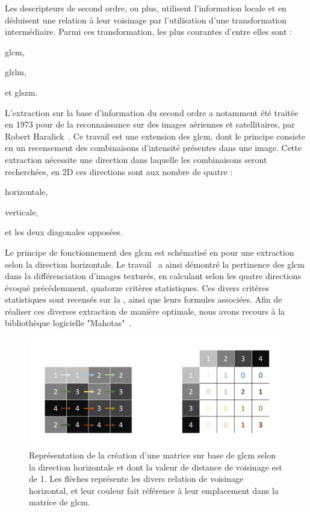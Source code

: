 Les descripteurs de second ordre, ou plus, utilisent l'information locale et en déduisent une relation à leur voisinage par l'utilisation d'une transformation intermédiaire. Parmi ces transformation, les plus courantes d'entre elles sont : 
\begin{inlinerate}
    \item \gls{glcm},
    \item \gls{glrlm},
    \item et \gls{glszm}.
\end{inlinerate} 
L'extraction sur la base d'information du second ordre a notamment été traitée en 1973 pour de la reconnaissance sur des images aériennes et satellitaires, par Robert Haralick~\cite{Haralick1973}. Ce travail est une extension des \gls{glcm}, dont le principe consiste en un recensement des combinaisons d'intensité présentes dans une image. Cette extraction nécessite une direction dans laquelle les combinaisons seront recherchées, en 2D ces directions sont aux nombre de quatre :
\begin{inlinerate}
    \item horizontale,
    \item verticale,
    \item et les deux diagonales opposées.
\end{inlinerate}
Le principe de fonctionnement des \gls{glcm} est schématisé en  pour une extraction selon la direction horizontale. Le travail~\cite{Haralick1973} a ainsi démontré la pertinence des \gls{glcm} dans la différenciation d'images texturés, en calculant selon les quatre directions évoqué précédemment, quatorze critères statistiques. Ces divers critères statistiques sont recensés sur la , ainsi que leurs formules associées. Afin de réaliser ces diverses extraction de manière optimale, nous avons recours à la bibliothèque logicielle "Mahotas"~\cite{coelho2012}.\par
 
\begin{figure}[H]
    \centering
    \includegraphics[width=\linewidth]{contents/chapter_4/resources/scheme_principle_GLCM.pdf}
    \caption{Représentation de la création d'une matrice sur base de \gls{glcm} selon la direction horizontale et dont la valeur de distance de voisinage est de 1. Les flèches représente les divers relation de voisinage horizontal, et leur couleur fait référence à leur emplacement dans la matrice de \gls{glcm}.}
    \label{fig:scheme_principle_GLCM}
\end{figure}\par

